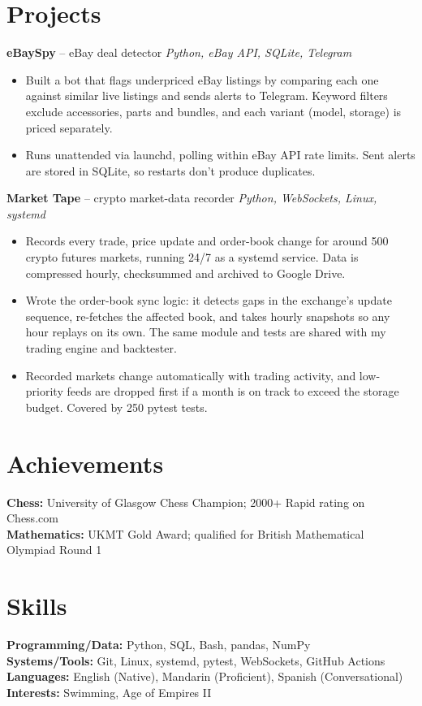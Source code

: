 \documentclass[11pt,a4paper]{article}
\begin{document}
\section{Projects}
\noindent \textbf{eBaySpy} -- eBay deal detector \hfill \textit{Python, eBay API, SQLite, Telegram}
\begin{itemize}
    \item Built a bot that flags underpriced eBay listings by comparing each one against similar live listings and sends alerts to Telegram. Keyword filters exclude accessories, parts and bundles, and each variant (model, storage) is priced separately.
    \item Runs unattended via launchd, polling within eBay API rate limits. Sent alerts are stored in SQLite, so restarts don't produce duplicates.
\end{itemize}
\vspace{4pt}
\noindent \textbf{Market Tape} -- crypto market-data recorder \hfill \textit{Python, WebSockets, Linux, systemd}
\begin{itemize}
    \item Records every trade, price update and order-book change for around 500 crypto futures markets, running 24/7 as a systemd service. Data is compressed hourly, checksummed and archived to Google Drive.
    \item Wrote the order-book sync logic: it detects gaps in the exchange's update sequence, re-fetches the affected book, and takes hourly snapshots so any hour replays on its own. The same module and tests are shared with my trading engine and backtester.
    \item Recorded markets change automatically with trading activity, and low-priority feeds are dropped first if a month is on track to exceed the storage budget. Covered by 250 pytest tests.
\end{itemize}
\section{Achievements}
\noindent \textbf{Chess:} University of Glasgow Chess Champion; 2000+ Rapid rating on Chess.com \\
\noindent \textbf{Mathematics:} UKMT Gold Award; qualified for British Mathematical Olympiad Round 1
\section{Skills}
\noindent \textbf{Programming/Data:} Python, SQL, Bash, pandas, NumPy \\
\noindent \textbf{Systems/Tools:} Git, Linux, systemd, pytest, WebSockets, GitHub Actions \\
\noindent \textbf{Languages:} English (Native), Mandarin (Proficient), Spanish (Conversational) \\
\noindent \textbf{Interests:} Swimming, Age of Empires II
\end{document}
